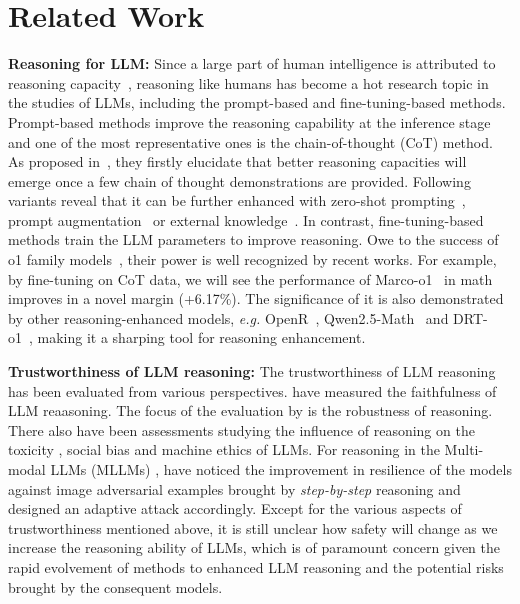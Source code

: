 
\section{Related Work}
\label{sec::related_work}
\textbf{Reasoning for LLM: } Since a large part of human intelligence is attributed to reasoning capacity~\citep{lohman2011intelligence}, reasoning like humans has become a hot research topic in the studies of LLMs, including the prompt-based and fine-tuning-based methods. Prompt-based methods improve the reasoning capability at the inference stage and one of the most representative ones is the chain-of-thought (CoT) method. As proposed in~\citet{wei2022chain}, they firstly elucidate that better reasoning capacities will emerge once a few chain of thought demonstrations are provided. Following variants reveal that it can be further enhanced with zero-shot prompting~\citep{kojima2022large,zhang2022automatic}, prompt augmentation~\citep{shum2023automatic} or external knowledge~\citep{liu2023retrieval,zhao2023verify}. In contrast, fine-tuning-based methods train the LLM parameters to improve reasoning. Owe to the success of o1 family models~\citep{jaech2024openai}, their power is well recognized by recent works. For example, by fine-tuning on CoT data, we will see the performance of Marco-o1~\citep{zhao2024marco} in math improves in a novel margin (+6.17\%). The significance of it is also demonstrated by other reasoning-enhanced models, \textit{e.g.} OpenR~\citep{wang2024openr}, Qwen2.5-Math~\citep{yang2024qwen25mathtechnicalreportmathematical} and DRT-o1~\citep{wang2024drt}, making it a sharping tool for reasoning enhancement.

\noindent\textbf{Trustworthiness of LLM reasoning: }The trustworthiness of LLM reasoning has been evaluated from various perspectives. \citet{Radhakrishnan2023QuestionDI, li-etal-2024-deceptive, paul-etal-2024-making, Chua2024BiasAugmentedCT} have measured the faithfulness of LLM reaasoning. The focus of the evaluation by \citet{Radhakrishnan2023QuestionDI, han-etal-2024-context, steenhoek2025errmachinevulnerabilitydetection, Self-correct-reasoning} is the robustness of reasoning. There also have been assessments studying the influence of reasoning on the toxicity \citep{not-think}, social bias \citep{not-think, Persona-Reasoning} and machine ethics \citep{Ethics-Reasoning} of LLMs. For reasoning in the Multi-modal LLMs (MLLMs) \citep{lu2022learn, 10.1609/aaai.v38i16.29776}, \citet{multimodel-reasoning} have noticed the improvement in resilience of the models against image adversarial examples brought by \textit{step-by-step} reasoning and designed an adaptive attack accordingly. Except for the various aspects of trustworthiness mentioned above, it is still unclear how safety will change as we increase the reasoning ability of LLMs, which is of paramount concern given the rapid evolvement of methods to enhanced LLM reasoning and the potential risks brought by the consequent models.



